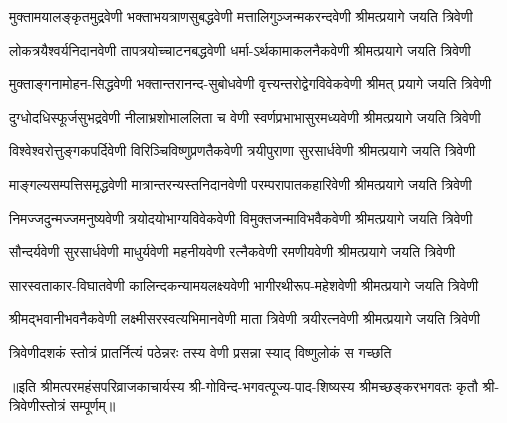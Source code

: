 
\twolineshloka
{मुक्तामयालङ्कृतमुद्रवेणी भक्ताभयत्राणसुबद्धवेणी}
{मत्तालिगुञ्जन्मकरन्दवेणी श्रीमत्प्रयागे जयति त्रिवेणी}%

\twolineshloka
{लोकत्रयैश्वर्यनिदानवेणी तापत्रयोच्चाटनबद्धवेणी}
{धर्मा-ऽर्थकामाकलनैकवेणी श्रीमत्प्रयागे जयति त्रिवेणी}%

\twolineshloka
{मुक्ताङ्गनामोहन-सिद्धवेणी भक्तान्तरानन्द-सुबोधवेणी}
{वृत्त्यन्तरोद्वेगविवेकवेणी श्रीमत् प्रयागे जयति त्रिवेणी}%

\twolineshloka
{दुग्धोदधिस्फूर्जसुभद्रवेणी नीलाभ्रशोभाललिता च वेणी}
{स्वर्णप्रभाभासुरमध्यवेणी श्रीमत्प्रयागे जयति त्रिवेणी}%

\twolineshloka
{विश्वेश्वरोत्तुङ्गकपर्दिवेणी विरिञ्चिविष्णुप्रणतैकवेणी}
{त्रयीपुराणा सुरसार्धवेणी श्रीमत्प्रयागे जयति त्रिवेणी}%

\twolineshloka
{माङ्गल्यसम्पत्तिसमृद्धवेणी मात्रान्तरन्यस्तनिदानवेणी}
{परम्परापातकहारिवेणी श्रीमत्प्रयागे जयति त्रिवेणी}%

\twolineshloka
{निमज्जदुन्मज्जमनुष्यवेणी त्रयोदयोभाग्यविवेकवेणी}
{विमुक्तजन्माविभवैकवेणी श्रीमत्प्रयागे जयति त्रिवेणी}%

\twolineshloka
{सौन्दर्यवेणी सुरसार्धवेणी माधुर्यवेणी महनीयवेणी}
{रत्नैकवेणी रमणीयवेणी श्रीमत्प्रयागे जयति त्रिवेणी}%

\twolineshloka
{सारस्वताकार-विघातवेणी कालिन्दकन्यामयलक्ष्यवेणी}
{भागीरथीरूप-महेशवेणी श्रीमत्प्रयागे जयति त्रिवेणी}%

\twolineshloka
{श्रीमद्भवानीभवनैकवेणी लक्ष्मीसरस्वत्यभिमानवेणी}
{माता त्रिवेणी त्रयीरत्नवेणी श्रीमत्प्रयागे जयति त्रिवेणी}%

\twolineshloka
{त्रिवेणीदशकं स्तोत्रं प्रातर्नित्यं पठेन्नरः}
{तस्य वेणी प्रसन्ना स्याद् विष्णुलोकं स गच्छति}%

॥इति श्रीमत्परमहंसपरिव्राजकाचार्यस्य श्री-गोविन्द-भगवत्पूज्य-पाद-शिष्यस्य
श्रीमच्छङ्करभगवतः कृतौ श्री-त्रिवेणीस्तोत्रं सम्पूर्णम्॥